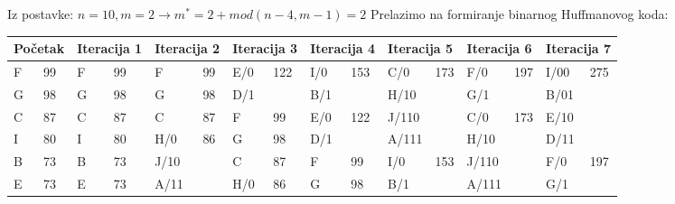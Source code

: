 \documentclass[12pt]{article}
\begin{document}
Iz postavke: $n = 10, m = 2 \to m^{*} = 2 + mod(n - 4, m - 1) = 2$
Prelazimo na formiranje binarnog Huffmanovog koda:
\newpage
\begin{table}[hp]
\hspace*{-1.0in}
\begin{tabular}{|l|l|l|l|l|l|l|l|l|l|l|l|l|l|l|l|}
\hline
\multicolumn{2}{|l|}{Početak} & \multicolumn{2}{l|}{Iteracija 1}               & \multicolumn{2}{l|}{Iteracija 2} & \multicolumn{2}{l|}{Iteracija 3} & \multicolumn{2}{l|}{Iteracija 4} & \multicolumn{2}{l|}{Iteracija 5} & \multicolumn{2}{l|}{Iteracija 6} & \multicolumn{2}{l|}{Iteracija 7} \\ \hline
F             & 99            & F   & 99                                       & F       & 99                     & E/0     & \multirow{2}{*}{122}   & I/0     & \multirow{2}{*}{153}   & C/0     & \multirow{4}{*}{173}   & F/0     & \multirow{2}{*}{197}   & I/00    & \multirow{4}{*}{275}   \\ \cline{1-6}
G             & 98            & G   & 98                                       & G       & 98                     & D/1     &                        & B/1     &                        & H/10    &                        & G/1     &                        & B/01    &                        \\ \cline{1-10} \cline{13-14}
C             & 87            & C   & 87                                       & C       & 87                     & F       & 99                     & E/0     & \multirow{2}{*}{122}   & J/110   &                        & C/0     & \multirow{4}{*}{173}   & E/10    &                        \\ \cline{1-8}
I             & 80            & I   & 80                                       & H/0     & \multirow{3}{*}{86}    & G       & 98                     & D/1     &                        & A/111   &                        & H/10    &                        & D/11    &                        \\ \cline{1-4} \cline{7-12} \cline{15-16} 
B             & 73            & B   & 73                                       & J/10    &                        & C       & 87                     & F       & 99                     & I/0     & \multirow{2}{*}{153}   & J/110   &                        & F/0     & \multirow{2}{*}{197}   \\ \cline{1-4} \cline{7-10}
E             & 73            & E   & 73                                       & A/11    &                        & H/0     & \multirow{3}{*}{86}    & G       & 98                     & B/1     &                        & A/111   &                        & G/1     &                        \\ \cline{1-6} \cline{9-16} 

\end{tabular}
\end{table}
\end{document}
